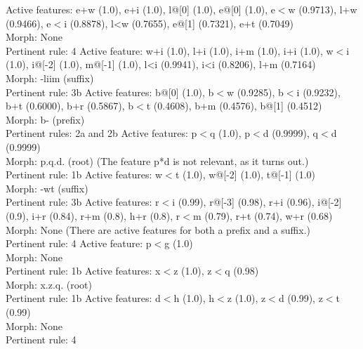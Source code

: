 \begin{exe}
\ex Active features: e+w (1.0), e+i (1.0), l@[0] (1.0), e@[0] (1.0), e$<$w (0.9713), l+w (0.9466), e$<$i (0.8878), l<w (0.7655), e@[1] (0.7321), e+t (0.7049) \\
Morph: None \\
Pertinent rule: 4
%
\ex Active feature: w+i (1.0), l+i (1.0), i+m (1.0), i+i (1.0), w$<$i (1.0), i@[-2] (1.0), m@[-1] (1.0), l<i (0.9941), i<i (0.8206), l+m (0.7164) \\
Morph: -liim (suffix) \\
Pertinent rule: 3b
%
%
\ex Active features: b@[0] (1.0), b$<$w (0.9285), b$<$i (0.9232), b+t (0.6000), b+r (0.5867), b$<$t (0.4608), b+m (0.4576), b@[1] (0.4512) \\
Morph: b- (prefix) \\
Pertinent rules: 2a and 2b 
%
\ex Active features: p$<$q (1.0), p$<$d (0.9999), q$<$d (0.9999) \\
Morph: p.q.d. (root)  (The feature p*d is not relevant, as it turns out.) \\
Pertinent rule: 1b
%
\ex Active features: w$<$t (1.0), w@[-2] (1.0), t@[-1] (1.0) \\
Morph: -wt (suffix) \\
Pertinent rule: 3b
%
\ex Active features: r$<$i (0.99), r@[-3] (0.98), r+i (0.96), i@[-2] (0.9), i+r (0.84), r+m (0.8), h+r (0.8), r$<$m (0.79), r+t (0.74), w+r (0.68) \\
Morph: None (There are active features for both a prefix and a suffix.) \\
Pertinent rule: 4
%
\ex Active feature: p$<$g (1.0) \\
Morph: None \\
Pertinent rule: 1b 
%
\ex Active features: x$<$z (1.0), z$<$q (0.98) \\
Morph: x.z.q. (root) \\
Pertinent rule: 1b
%
\ex Active features: d$<$h (1.0), h$<$z (1.0), z$<$d (0.99), z$<$t (0.99) \\
Morph: None \\
Pertinent rule: 4
\end{exe}

